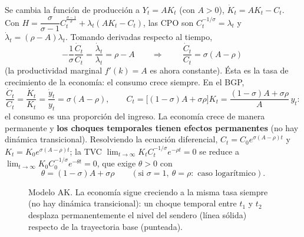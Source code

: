 \documentclass[11pt]{article}
\renewcommand{\boxed}[1]{#1}     %
\theoremstyle{definition}
\begin{document}
Se cambia la función de producción a $Y_{t}=AK_{t}$ (con $A>0$), $\dot{K}_{t}=AK_{t}-C_{t}$. Con
$H=\dfrac{\sigma}{\sigma-1}C_{t}^{\frac{\sigma-1}{\sigma}}+\lambda_{t}(AK_{t}-C_{t})$, las CPO son
$C_{t}^{-1/\sigma}=\lambda_{t}$ y $\dot{\lambda}_{t}=(\rho-A)\lambda_{t}$. Tomando derivadas respecto
al tiempo,
\begin{equation}
-\frac{1}{\sigma}\frac{\dot{C}_{t}}{C_{t}}=\frac{\dot{\lambda}_{t}}{\lambda_{t}}=\rho-A
\qquad\Longrightarrow\qquad
\boxed{\ \frac{\dot{C}_{t}}{C_{t}}=\sigma(A-\rho)\ }
\end{equation}
(la productividad marginal $f'(k)=A$ es ahora constante). Ésta es la tasa de crecimiento de la
economía: el consumo crece siempre. En el BGP,
\begin{equation}
\frac{\dot{C}_{t}}{C_{t}}=\frac{\dot{K}_{t}}{K_{t}}=\frac{\dot{y}_{t}}{y_{t}}=\sigma(A-\rho),
\qquad
C_{t}=\big[(1-\sigma)A+\sigma\rho\big]K_{t}=\frac{(1-\sigma)A+\sigma\rho}{A}\,y_{t}:
\end{equation}
el consumo es una proporción del ingreso. La economía crece de manera permanente y \textbf{los choques
temporales tienen efectos permanentes} (no hay dinámica transicional). Resolviendo la ecuación
diferencial, $C_{t}=C_{0}e^{\sigma(A-\rho)t}$ y $K_{t}=K_{0}e^{\sigma(A-\rho)t}$; la TVC
$\lim_{t\to\infty}K_{t}C_{t}^{-1/\sigma}e^{-\rho t}=0$ se reduce a
$\lim_{t\to\infty}K_{0}C_{0}^{-1/\sigma}e^{-\theta t}=0$, que exige $\theta>0$ con
\begin{equation}
\theta=(1-\sigma)A+\sigma\rho\qquad(\text{si }\sigma=1,\ \theta=\rho:\text{ caso logarítmico}).
\end{equation}

\begin{figure}[h]
\centering
{}
\caption{Modelo AK. La economía sigue creciendo a la misma tasa siempre (no hay dinámica
transicional): un choque temporal entre $t_{1}$ y $t_{2}$ desplaza permanentemente el nivel del
sendero (línea sólida) respecto de la trayectoria base (punteada).}
\end{figure}
\end{document}
